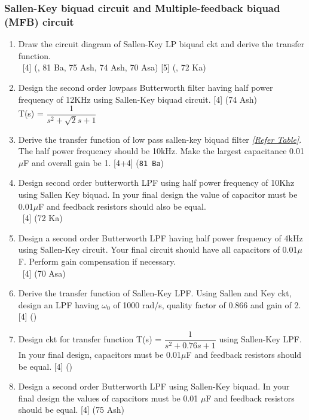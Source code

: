 \documentclass[12pt]{article}
\newcommand{\w}{\(\omega\)}
\newcommand{\enter}{\\\textcolor{white}{1}}
\begin{document}
		\subsubsection{Sallen-Key biquad circuit and Multiple-feedback biquad (MFB) circuit}
			\begin{enumerate}
				\item Draw the circuit diagram of Sallen-Key LP biquad ckt and derive the transfer function.
				\enter\hfill [4] (, 81 Ba, 75 Ash, 74 Ash, 70 Asa) [5] (, 72 Ka)
				
				\item Design the second order lowpass Butterworth filter having half power frequency of 12KHz using Sallen-Key biquad circuit. \hfill [4] (74 Ash)\\
				T(s) = $\dfrac{1}{s^2+\sqrt{2}s+1}$
				
				\item Derive the transfer function of low pass sallen-key biquad filter \textit{[\hyperref[sec:tables_81ba]{Refer Table]}}. The half power frequency should be 10kHz. Make the largest capacitance 0.01$\mu$F and overall gain be 1. \hfill [4+4] (\texttt{81 Ba})

				\item Design second order butterworth LPF using half power frequency of 10Khz using Sallen Key biquad. In your final design the value of capacitor must be 0.01$\mu$F and feedback resistors should also be equal.
				\enter\hfill [4] (72 Ka)

				\item Design a second order Butterworth LPF having half power frequency of 4kHz using Sallen-Key circuit. Your final circuit should have all capacitors of 0.01$\mu$F. Perform gain compensation if necessary.
				\enter\hfill [4] (70 Asa)

				\item Derive the transfer function of Sallen-Key LPF. Using Sallen and Key ckt, design an LPF having \w$_0$ of 1000 rad/s, quality factor of 0.866 and gain of 2. \hfill [4] ()

				\item Design ckt for transfer function T(s) = $\dfrac{1}{s^2+0.76s+1}$ using Sallen-Key LPF. In your final design, capacitors must be 0.01$\mu$F and feedback resistors should be equal. \hfill [4] ()

				\item Design a second order Butterworth LPF using Sallen-Key biquad. In your final design the values of capacitors must be 0.01 $\mu$F and feedback resistors should be equal. \hfill [4] (75 Ash)


\end{enumerate}
\end{document}
